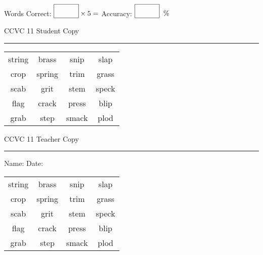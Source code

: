 \documentclass{memoir}
\begin{document}
\normalsize

Words Correct: $\fbox{\phantom{\huge 100}} \times 5 = $ Accuracy: $\fbox{\phantom{\huge 100}}\;\; \%$ 

\vfill

\newpage


\footnotesize \noindent
CCVC 11 \hfill Student Copy
\smallskip
\hrule

\Large

\setlength{\tabcolsep}{14pt}
\def\arraystretch{3}

{\selectfont


\begin{vplace}[0.5]
\begin{center}
\begin{tabular}{cccc}
string & brass       & snip & slap            \\
crop & spring & trim & grass                    \\
scab & grit      & stem & speck \\
flag             & crack       & press       & blip \\
grab                    & step & smack & plod \\
\end{tabular}
\end{center}
\end{vplace}

}

\newpage

\footnotesize \noindent
CCVC 11 \hfill Teacher Copy
\smallskip
\hrule

\normalsize

\vfill

\noindent
Name: \underline{\hspace{1.75in}} \hfill Date: \underline{\hspace{1in}}

\Large

{\selectfont


\begin{vplace}[0.5]
\begin{center}
\begin{tabular}{cccc}
string & brass       & snip & slap            \\
crop & spring & trim & grass                    \\
scab & grit      & stem & speck \\
flag             & crack       & press       & blip \\
grab                    & step & smack & plod \\
\end{tabular}
\end{center}
\end{vplace}



}
\end{document}
